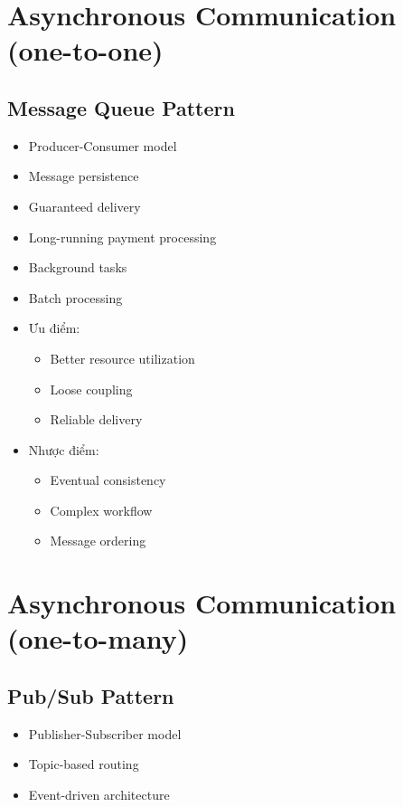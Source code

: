 \section{Asynchronous Communication (one-to-one)}
\subsection{Message Queue Pattern}

\begin{itemize}
    \item Producer-Consumer model
    \item Message persistence
    \item Guaranteed delivery
\end{itemize}

\begin{itemize}
    \item Long-running payment processing
    \item Background tasks
    \item Batch processing
\end{itemize}

\begin{itemize}
    \item Ưu điểm:
    \begin{itemize}
        \item Better resource utilization
        \item Loose coupling
        \item Reliable delivery
    \end{itemize}
    \item Nhược điểm:
    \begin{itemize}
        \item Eventual consistency
        \item Complex workflow
        \item Message ordering
    \end{itemize}
\end{itemize}

\section{Asynchronous Communication (one-to-many)}
\subsection{Pub/Sub Pattern}
\begin{itemize}
    \item Publisher-Subscriber model
    \item Topic-based routing
    \item Event-driven architecture
\end{itemize}

